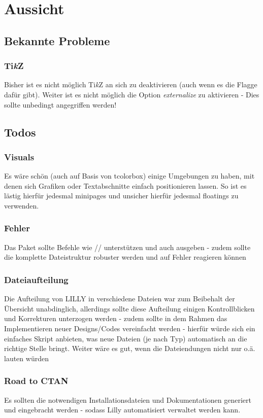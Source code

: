 \chapter{Aussicht}
\section{Bekannte Probleme}
\subsection{Ti\emph{k}Z}
Bisher ist es nicht möglich Ti\emph{k}Z an sich zu deaktivieren (auch wenn es die Flagge dafür gibt). \textcolor{Awesome}{Weiter ist es nicht möglich die Option \emph{externalize} zu aktivieren} - Dies sollte unbedingt angegriffen werden!


\section{Todos}
\subsection{Visuals}
Es wäre schön (auch auf Basis von tcolorbox) einige Umgebungen zu haben, mit denen sich Grafiken oder Textabschnitte einfach positionieren lassen. So ist es lästig hierfür jedesmal minipages und unsicher hierfür jedesmal floatings zu verwenden.
\subsection{Fehler}
Das Paket sollte Befehle wie // unterstützen und auch ausgeben - zudem sollte die komplette Dateistruktur robuster werden und auf Fehler reagieren können
\subsection{Dateiaufteilung}
Die Aufteilung von LILLY in verschiedene Dateien war zum Beibehalt der Übersicht unabdinglich, allerdings sollte diese Aufteilung einigen Kontrollblicken und Korrekturen unterzogen werden - zudem sollte in dem Rahmen das Implementieren neuer Designs/Codes vereinfacht werden - hierfür würde sich ein einfaches Skript anbieten, was neue Dateien (je nach Typ) automatisch an die richtige Stelle bringt. Weiter wäre es gut, wenn die Dateiendungen nicht nur  o.ä. lauten würden
\subsection{Road to CTAN}
Es sollten die notwendigen Installationsdateien und Dokumentationen generiert und eingebracht werden - sodass Lilly automatisiert verwaltet werden kann.

